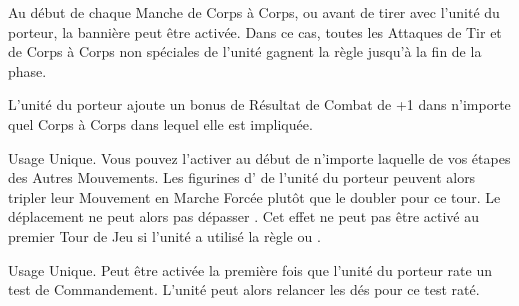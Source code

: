 Au début de chaque Manche de Corps à Corps, ou avant de tirer avec l'unité du porteur, la bannière peut être activée. Dans ce cas, toutes les Attaques de Tir et de Corps à Corps non spéciales de l'unité gagnent la règle \flamingattacks{} jusqu'à la fin de la phase.

\columnbreak

L'unité du porteur ajoute un bonus de Résultat de Combat de +1 dans n'importe quel Corps à Corps dans lequel elle est impliquée.

Usage Unique. Vous pouvez l'activer au début de n'importe laquelle de vos étapes des Autres Mouvements. Les figurines d'\infantry{} de l'unité du porteur peuvent alors tripler leur Mouvement en Marche Forcée plutôt que le doubler pour ce tour. Le déplacement ne peut alors pas dépasser . Cet effet ne peut pas être activé au premier Tour de Jeu si l'unité a utilisé la règle \vanguard{} ou \scout{}.

Usage Unique. Peut être activée la première fois que l'unité du porteur rate un test de Commandement. L'unité peut alors relancer les dés pour ce test raté.

\endpricelist
